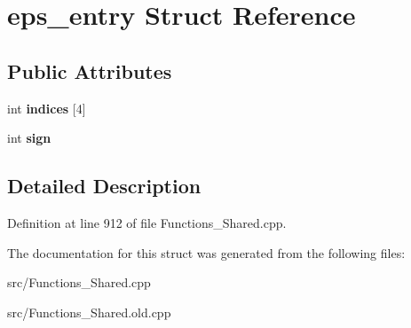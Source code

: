 \hypertarget{structeps__entry}{}\section{eps\+\_\+entry Struct Reference}
\label{structeps__entry}
\subsection*{Public Attributes}
\begin{DoxyCompactItemize}
\item 
\hypertarget{structeps__entry_abcc0bb107ccb66ab7bb6e9925457c9c9}{}int {\bfseries indices} \mbox{[}4\mbox{]}\label{structeps__entry_abcc0bb107ccb66ab7bb6e9925457c9c9}

\item 
\hypertarget{structeps__entry_a6557cf0ea08b5afe0e6f525e13934712}{}int {\bfseries sign}\label{structeps__entry_a6557cf0ea08b5afe0e6f525e13934712}

\end{DoxyCompactItemize}


\subsection{Detailed Description}


Definition at line 912 of file Functions\+\_\+\+Shared.\+cpp.



The documentation for this struct was generated from the following files\+:\begin{DoxyCompactItemize}
\item 
src/Functions\+\_\+\+Shared.\+cpp\item 
src/Functions\+\_\+\+Shared.\+old.\+cpp\end{DoxyCompactItemize}
